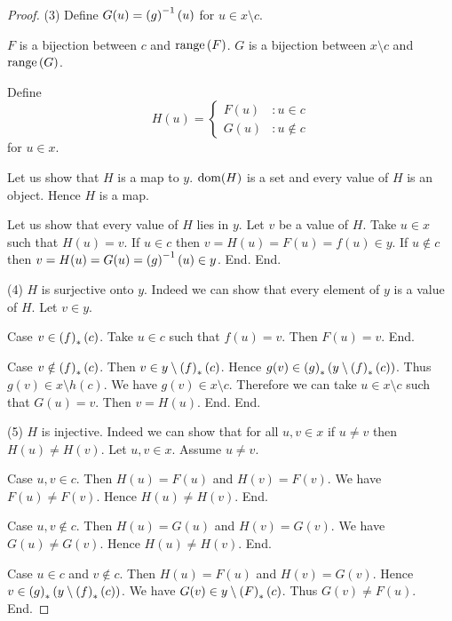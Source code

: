 \documentclass[../../set-theory/set-theory.tex]{subfiles}
\begin{document}
\begin{forthel}
\begin{proof}
        (3) Define $G(u) = \left(g\right)^{-1}(u)$ for $u \in x \setminus c$.

        $F$ is a bijection between $c$ and $\mathrm{range}\left(F\right)$.
        $G$ is a bijection between $x \setminus c$ and $\mathrm{range}\left(G\right)$.

        Define \[ H(u) =
          \begin{cases}
            F(u) & : u \in c \\
            G(u) & : u \notin c
          \end{cases} \]
        for $u \in x$.

        Let us show that $H$ is a map to $y$.
          $\operatorname{dom}(H)$ is a set and every value of $H$ is an object.
          Hence $H$ is a map.

          Let us show that every value of $H$ lies in $y$.
            Let $v$ be a value of $H$.
            Take $u \in x$ such that $H(u) = v$.
            If $u \in c$ then $v = H(u) = F(u) = f(u) \in y$.
            If $u \notin c$ then $v = H(u) = G(u) = \left(g\right)^{-1}(u) \in y$.
          End.
        End.

        (4) $H$ is surjective onto $y$.
        Indeed we can show that every element of $y$ is a value of $H$.
          Let $v \in y$.

          Case $v \in \left(f\right)_{*}(c)$.
            Take $u \in c$ such that $f(u) = v$.
            Then $F(u) = v$.
          End.

          Case $v \notin \left(f\right)_{*}(c)$.
            Then $v \in y \setminus \left(f\right)_{*}(c)$.
            Hence $g(v) \in \left(g\right)_{*}(y \setminus \left(f\right)_{*}(c))$.
            Thus $g(v) \in x \setminus h(c)$.
            We have $g(v) \in x \setminus c$.
            Therefore we can take $u \in x \setminus c$ such that $G(u) = v$.
            Then $v = H(u)$.
          End.
        End.

        (5) $H$ is injective.
        Indeed we can show that for all $u, v \in x$ if $u \neq v$ then
        $H(u) \neq H(v)$.
          Let $u,v \in x$.
          Assume $u \neq v$.

          Case $u,v \in c$.
            Then $H(u) = F(u)$ and $H(v) = F(v)$.
            We have $F(u) \neq F(v)$.
            Hence $H(u) \neq H(v)$.
          End.

          Case $u,v \notin c$.
            Then $H(u) = G(u)$ and $H(v) = G(v)$.
            We have $G(u) \neq G(v)$.
            Hence $H(u) \neq H(v)$.
          End.

          Case $u \in c$ and $v \notin c$.
            Then $H(u) = F(u)$ and $H(v) = G(v)$.
            Hence $v \in \left(g\right)_{*}(y \setminus \left(f\right)_{*}(c))$.
            We have $G(v) \in y \setminus \left(F\right)_{*}(c)$.
            Thus $G(v) \neq F(u)$.
          End.


\end{proof}
\end{forthel}
\end{document}
